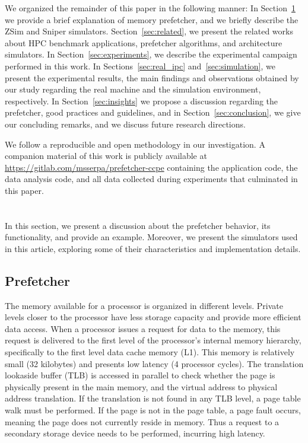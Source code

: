 \documentclass[AMA,final,STIX1COL]{WileyNJD-v2}
\def\COMPANION{{\scriptsize\url{https://gitlab.com/msserpa/prefetcher-ccpe}}\xspace}
\newcommand\new[1]{{\color{red}{#1}}}
\begin{document}
We organized the remainder of this paper in the following manner: 
In Section~\ref{sec:definitions} we provide a brief explanation of memory prefetcher, and we briefly describe the ZSim and Sniper simulators. 
Section~\ref{sec:related}, we present the related works about HPC benchmark applications, prefetcher algorithms, and architecture simulators. 
In Section~\ref{sec:experiments}, we describe the experimental campaign performed in this work. 
In Sections~\ref{sec:real_ipc} and~\ref{sec:simulation}, we present the experimental results, the main findings and observations obtained by our study regarding the real machine and the simulation environment, respectively.
In Section~\ref{sec:insights} we propose a discussion regarding the prefetcher, good practices and guidelines, and in Section~\ref{sec:conclusion}, we give our concluding remarks, and we discuss future research directions.

We follow a reproducible and open methodology in our investigation. A companion material of this work is publicly available at \COMPANION containing the application code, the data analysis code, and all data collected during experiments that culminated in this paper.

\section{\new{Background}}\label{sec:definitions}

In this section, we present a discussion about the prefetcher behavior, its functionality, and provide an example.
Moreover, we present the simulators used in this article, exploring some of their characteristics and implementation details.

\subsection{Prefetcher}

The memory available for a processor is organized in different levels.
Private levels closer to the processor have less storage capacity and provide more efficient data access. 
When a processor issues a request for data to the memory, this request is delivered to the first level of the processor's internal memory hierarchy, specifically to the first level data cache memory (L1).
This memory is relatively small (32 kilobytes) and presents low latency (4 processor cycles).
The translation lookaside buffer (TLB) is accessed in parallel to check whether the page is physically present in the main memory, and the virtual address to physical address translation.
If the translation is not found in any TLB level, a page table walk must be performed.
If the page is not in the page table, a page fault occurs, meaning the page does not currently reside in memory.
Thus a request to a secondary storage device needs to be performed, incurring high latency.
\end{document}
